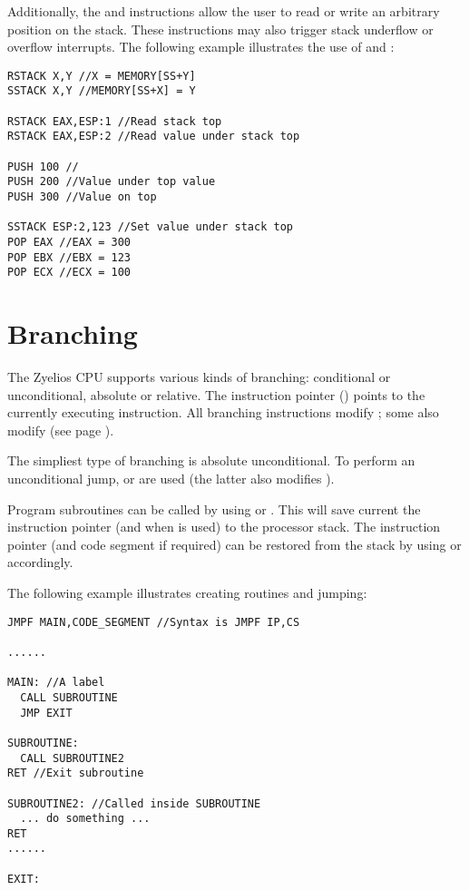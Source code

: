 Additionally, the  and  instructions allow the user to read or write an arbitrary position on the stack. These instructions may also trigger stack underflow or overflow interrupts. The following example illustrates the use of  and :

\begin{verbatim}
RSTACK X,Y //X = MEMORY[SS+Y]
SSTACK X,Y //MEMORY[SS+X] = Y

RSTACK EAX,ESP:1 //Read stack top
RSTACK EAX,ESP:2 //Read value under stack top

PUSH 100 //
PUSH 200 //Value under top value
PUSH 300 //Value on top

SSTACK ESP:2,123 //Set value under stack top
POP EAX //EAX = 300
POP EBX //EBX = 123
POP ECX //ECX = 100
\end{verbatim}

\section{Branching} \label{branching}
The Zyelios CPU supports various kinds of branching: conditional or unconditional, absolute or relative. The instruction pointer () points to the currently executing instruction. All branching instructions modify ; some also modify  (see page \pageref{segments}).

The simpliest type of branching is absolute unconditional. To perform an unconditional jump,  or  are used (the latter also modifies ).

Program subroutines can be called by using  or . This will save current the instruction pointer (and  when  is used) to the processor stack. The instruction pointer (and code segment if required) can be restored from the stack by using  or  accordingly.

The following example illustrates creating routines and jumping:

\begin{verbatim}
JMPF MAIN,CODE_SEGMENT //Syntax is JMPF IP,CS

......

MAIN: //A label
  CALL SUBROUTINE
  JMP EXIT

SUBROUTINE:
  CALL SUBROUTINE2
RET //Exit subroutine

SUBROUTINE2: //Called inside SUBROUTINE
  ... do something ...
RET
......

EXIT:
\end{verbatim}

